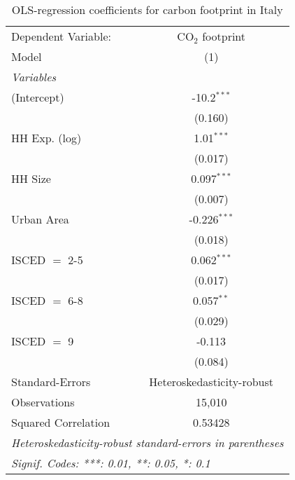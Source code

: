 
\begin{table}[htbp!]
   \centering
   \small
   \begin{adjustbox}{width = 1\textwidth, max height = 0.95\textheight, center}
      \begin{threeparttable}[b]
         \caption{\label{tab:OLS_2_ITA} OLS-regression coefficients for carbon footprint in Italy}
         \begin{tabular}{lc}
            \tabularnewline \midrule \midrule
            Dependent Variable: & CO$_{2}$ footprint\\  
            Model               & (1)\\  
            \midrule
            \emph{Variables}\\
            (Intercept)         & -10.2$^{***}$\\   
                                & (0.160)\\   
            HH Exp. (log)       & 1.01$^{***}$\\   
                                & (0.017)\\   
            HH Size             & 0.097$^{***}$\\   
                                & (0.007)\\   
            Urban Area          & -0.226$^{***}$\\   
                                & (0.018)\\   
            ISCED $=$ 2-5       & 0.062$^{***}$\\   
                                & (0.017)\\   
            ISCED $=$ 6-8       & 0.057$^{**}$\\   
                                & (0.029)\\   
            ISCED $=$ 9         & -0.113\\   
                                & (0.084)\\   
            \midrule 
            Standard-Errors     & Heteroskedasticity-robust \\   
            Observations        & 15,010\\  
            Squared Correlation & 0.53428\\  
            \midrule \midrule
            \multicolumn{2}{l}{\emph{Heteroskedasticity-robust standard-errors in parentheses}}\\
            \multicolumn{2}{l}{\emph{Signif. Codes: ***: 0.01, **: 0.05, *: 0.1}}\\
         \end{tabular}
         

\end{threeparttable}
\end{adjustbox}
\end{table}
